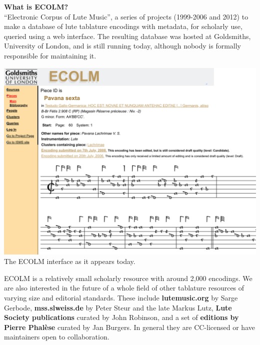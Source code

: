\documentclass[a0,portrait]{a0poster}
\begin{document}
\begin{multicols}{3}
  
  \begin{sloppypar}
    
  \noindent\textbf{\LARGE What is ECOLM?}\\

  \noindent``Electronic Corpus of Lute Music'', a series of projects
  (1999-2006 and 2012) to make a database of lute tablature encodings
  with metadata, for scholarly use, queried using a web interface. The
  resulting database was hosted at Goldsmiths, University of London,
  and is still running today, although nobody is formally responsible
  for maintaining it.

  \begin{center}\vspace{2cm}
  \includegraphics[width=0.95\columnwidth,frame]{images/ecolm-screenshot}\\
  {\small The ECOLM interface as it appears today.}
  \end{center}\vspace{2cm}

  \noindent ECOLM is a relatively small scholarly resource with around
  2,000 encodings. We are also interested in the future of a whole
  field of other tablature resources of varying size and editorial
  standards. These include {\bf lutemusic.org} by Sarge Gerbode, {\bf
    mss.slweiss.de} by Peter Steur and the late Markus Lutz, {\bf Lute
    Society publications} curated by John Robinson, and a set of {\bf
    editions by Pierre Phal\`ese} curated by Jan Burgers. In general
  they are CC-licensed or have maintainers open to collaboration.


\end{sloppypar}
\end{multicols}
\end{document}
